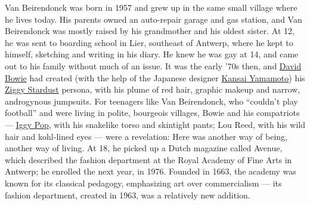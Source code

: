 Van Beirendonck was born in 1957 and grew up in the same small village
where he lives today. His parents owned an auto-repair garage and gas
station, and Van Beirendonck was mostly raised by his grandmother and
his oldest sister. At 12, he was sent to boarding school in Lier,
southeast of Antwerp, where he kept to himself, sketching and writing in
his diary. He knew he was gay at 14, and came out to his family without
much of an issue. It was the early '70s then, and
\href{https://www.nytimes3xbfgragh.onion/topic/person/david-bowie}{David
Bowie} had created (with the help of the Japanese designer
\href{https://www.nytimes3xbfgragh.onion/2017/07/24/t-magazine/fashion/kansai-yamamoto-revival.html}{Kansai
Yamamoto}) his
\href{https://www.nytimes3xbfgragh.onion/slideshow/2016/01/11/t-magazine/david-bowie-style/s/11tmag-bowie-slide-77O9.html}{Ziggy
Stardust} persona, with his plume of red hair, graphic makeup and
narrow, androgynous jumpsuits. For teenagers like Van Beirendonck, who
``couldn't play football'' and were living in polite, bourgeois
villages, Bowie and his compatriots ---
\href{https://www.nytimes3xbfgragh.onion/2016/11/03/t-magazine/iggy-pop-life-class-nude-drawing-brooklyn-museum.html}{Iggy
Pop}, with his snakelike torso and skintight pants; Lou Reed, with his
wild hair and kohl-lined eyes --- were a revelation: Here was another
way of being, another way of living. At 18, he picked up a Dutch
magazine called Avenue, which described the fashion department at the
Royal Academy of Fine Arts in Antwerp; he enrolled the next year, in
1976. Founded in 1663, the academy was known for its classical pedagogy,
emphasizing art over commercialism --- its fashion department, created
in 1963, was a relatively new addition.

